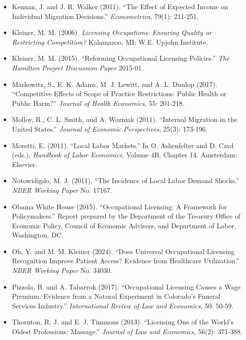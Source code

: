 \documentclass[12pt]{article}
\begin{document}
\begin{itemize}
\item Kennan, J. and J. R. Walker (2011). ``The Effect of Expected Income on Individual Migration Decisions.'' \textit{Econometrica}, 79(1): 211-251.

\item Kleiner, M. M. (2006). \textit{Licensing Occupations: Ensuring Quality or Restricting Competition?} Kalamazoo, MI: W.E. Upjohn Institute.

\item Kleiner, M. M. (2015). ``Reforming Occupational Licensing Policies.'' \textit{The Hamilton Project Discussion Paper} 2015-01.

\item Markowitz, S., E. K. Adams, M. J. Lewitt, and A. L. Dunlop (2017). ``Competitive Effects of Scope of Practice Restrictions: Public Health or Public Harm?'' \textit{Journal of Health Economics}, 55: 201-218.

\item Molloy, R., C. L. Smith, and A. Wozniak (2011). ``Internal Migration in the United States.'' \textit{Journal of Economic Perspectives}, 25(3): 173-196.

\item Moretti, E. (2011). ``Local Labor Markets.'' In O. Ashenfelter and D. Card (eds.), \textit{Handbook of Labor Economics}, Volume 4B, Chapter 14. Amsterdam: Elsevier.

\item Notowidigdo, M. J. (2011). ``The Incidence of Local Labor Demand Shocks.'' \textit{NBER Working Paper} No. 17167.

\item Obama White House (2015). ``Occupational Licensing: A Framework for Policymakers.'' Report prepared by the Department of the Treasury Office of Economic Policy, Council of Economic Advisers, and Department of Labor. Washington, DC.

\item Oh, Y. and M. M. Kleiner (2024). ``Does Universal Occupational Licensing Recognition Improve Patient Access? Evidence from Healthcare Utilization.'' \textit{NBER Working Paper} No. 34030.

\item Pizzola, B. and A. Tabarrok (2017). ``Occupational Licensing Causes a Wage Premium: Evidence from a Natural Experiment in Colorado's Funeral Services Industry.'' \textit{International Review of Law and Economics}, 50: 50-59.

\item Thornton, R. J. and E. J. Timmons (2013). ``Licensing One of the World's Oldest Professions: Massage.'' \textit{Journal of Law and Economics}, 56(2): 371-388.
\end{itemize}
\end{document}
